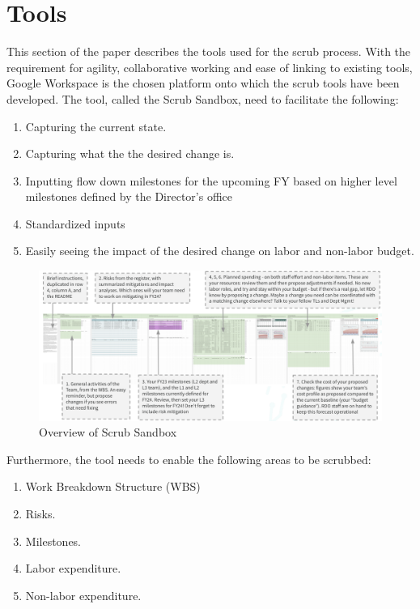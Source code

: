 \section{Tools} \label{sec:tools}

This section of the paper describes the tools used for the scrub process. With the requirement for agility, collaborative working and ease of linking to existing tools, Google Workspace  is the chosen platform onto which the scrub tools have been developed. The tool, called the Scrub Sandbox,  need to facilitate the following:

\begin{enumerate}
\item Capturing the current state.
\item Capturing what the the desired change is.
\item Inputting flow down milestones for the upcoming FY based on higher level milestones defined by the Director’s office
\item Standardized inputs
\item Easily seeing the impact of the desired change on labor and non-labor budget.
\end{enumerate}

\begin{figure}[h!]
\begin{centering}
\includegraphics[width=1.0\textwidth]{Figure3OverviewScrubSandbox}
	\caption{ Overview of Scrub Sandbox
\label{fig:sandbox}}
\end{centering}
\end{figure}


Furthermore, the tool needs to enable the following areas to be scrubbed:
\begin{enumerate}
\item Work Breakdown Structure (WBS)
\item Risks.
\item Milestones.
\item Labor expenditure.
\item Non-labor expenditure.
\end{enumerate}

